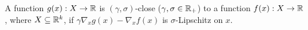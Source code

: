 \begin{definition}
\label{def:closeness}
    A function $g(x): X \to \mathbb{R}$ is $(\gamma, \sigma)$-close ($\gamma, \sigma \in \mathbb{R}_{+}$) to a function $f(x): X \to \mathbb{R}$, where $X \subseteq \mathbb{R}^k$, if $\gamma \nabla_x g(x) - \nabla_x f(x)$ is $\sigma$-Lipschitz on $x$.
\end{definition}